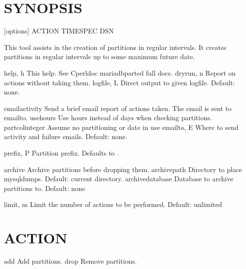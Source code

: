 \documentclass[letterpaper,10pt,english]{sphinxmanual}
\begin{document}
\section{SYNOPSIS}
\label{\detokenize{mariadb-parted:synopsis}}
 {[}options{]} ACTION TIMESPEC DSN

This tool assists in the creation of partitions in regular intervals.
It creates partitions in regular intervals up to some maximum future date.

\begin{sphinxVerbatim}[commandchars=\\\{\}]
\PYGZhy{}\PYGZhy{}help,          \PYGZhy{}h   This help. See C\PYGZlt{}perldoc mariadb\PYGZhy{}parted\PYGZgt{}  full docs.
\PYGZhy{}\PYGZhy{}dryrun,        \PYGZhy{}n   Report on actions without taking them.
\PYGZhy{}\PYGZhy{}logfile,       \PYGZhy{}L   Direct output to given logfile. Default: none.

\PYGZhy{}\PYGZhy{}email\PYGZhy{}activity      Send a brief email report of actions taken.
                      The email is sent to \PYGZhy{}\PYGZhy{}email\PYGZhy{}to.
\PYGZhy{}\PYGZhy{}use\PYGZhy{}hours          Use hours instead of days when checking partitions.
\PYGZhy{}\PYGZhy{}partcol\PYGZhy{}integer     Assume no partitioning  or date  in use
\PYGZhy{}\PYGZhy{}email\PYGZhy{}to,      \PYGZhy{}E   Where to send activity and failure emails.
                      Default: none.

\PYGZhy{}\PYGZhy{}prefix,        \PYGZhy{}P   Partition prefix. Defaults to .

\PYGZhy{}\PYGZhy{}archive             Archive partitions before dropping them.
\PYGZhy{}\PYGZhy{}archive\PYGZhy{}path        Directory to place mysqldumps.
                      Default: current directory.
\PYGZhy{}\PYGZhy{}archive\PYGZhy{}database    Database to archive partitions to.
                      Default: none

\PYGZhy{}\PYGZhy{}limit,         \PYGZhy{}m   Limit the number of actions to be performed.
                      Default:  unlimited
\end{sphinxVerbatim}


\section{ACTION}
\label{\detokenize{mariadb-parted:action}}
\begin{sphinxVerbatim}[commandchars=\\\{\}]
\PYGZhy{}\PYGZhy{}add   Add partitions.
\PYGZhy{}\PYGZhy{}drop  Remove partitions.
\end{sphinxVerbatim}
\end{document}
